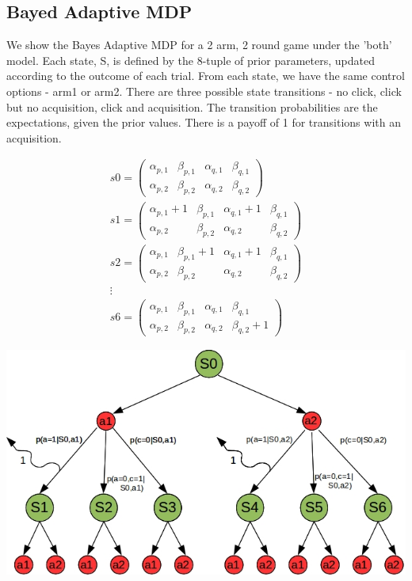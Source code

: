 \documentclass[12pt]{article}
\begin{document}
\subsection{Bayed Adaptive MDP}

We show the Bayes Adaptive MDP for a 2 arm, 2 round game under the 'both' model. Each state, S, is defined by the 8-tuple of prior parameters, updated according to the outcome of each trial. From each state, we have the same control options - arm1 or arm2. There are three possible state transitions - no click, click but no acquisition, click and acquisition. The transition probabilities are the expectations, given the prior values. There is a payoff of 1 for transitions with an acquisition.

\begin{align}
s0 =
 \begin{pmatrix}
  \alpha_{p,1} & \beta_{p,1} & \alpha_{q,1} & \beta_{q,1} \\
  \alpha_{p,2} & \beta_{p,2} & \alpha_{q,2} & \beta_{q,2} 
 \end{pmatrix} \\
s1 =
  \begin{pmatrix}
   \alpha_{p,1}+1 & \beta_{p,1} & \alpha_{q,1}+1 & \beta_{q,1} \\
   \alpha_{p,2} & \beta_{p,2} & \alpha_{q,2} & \beta_{q,2} 
  \end{pmatrix} \\
s2 =
  \begin{pmatrix}
   \alpha_{p,1} & \beta_{p,1}+1 & \alpha_{q,1}+1 & \beta_{q,1} \\
   \alpha_{p,2} & \beta_{p,2} & \alpha_{q,2} & \beta_{q,2} 
  \end{pmatrix} \\
\vdots \\
s6 =
  \begin{pmatrix}
   \alpha_{p,1} & \beta_{p,1} & \alpha_{q,1} & \beta_{q,1} \\
   \alpha_{p,2} & \beta_{p,2} & \alpha_{q,2} & \beta_{q,2}+1 
  \end{pmatrix}
\end{align} 

\includegraphics[scale=0.6]{BAMDP.jpg}
\end{document}
